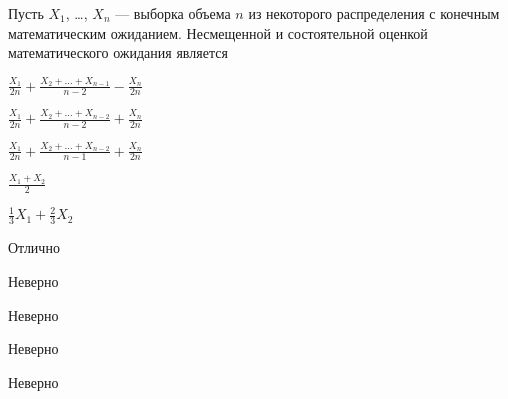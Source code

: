 
\begin{question}
Пусть \(X_1\), \ldots, \(X_n\) --- выборка объема \(n\) из некоторого
распределения с конечным математическим ожиданием. Несмещенной и
состоятельной оценкой математического ожидания является
\begin{answerlist}
  \item \(\frac{X_1}{2 n}+\frac{X_2+\ldots+X_{n-1}}{n-2}-\frac{X_n}{2 n}\)
  \item \(\frac{X_1}{2 n}+\frac{X_2+\ldots+X_{n-2}}{n-2}+\frac{X_n}{2 n}\)
  \item \(\frac{X_1}{2 n}+\frac{X_2+\ldots+X_{n-2}}{n-1}+\frac{X_n}{2 n}\)
  \item \(\frac{X_1+X_2}{2}\)
  \item \(\frac{1}{3} X_1 + \frac{2}{3} X_2\)
\end{answerlist}
\end{question}

\begin{solution}
\begin{answerlist}
  \item Отлично
  \item Неверно
  \item Неверно
  \item Неверно
  \item Неверно
\end{answerlist}
\end{solution}

